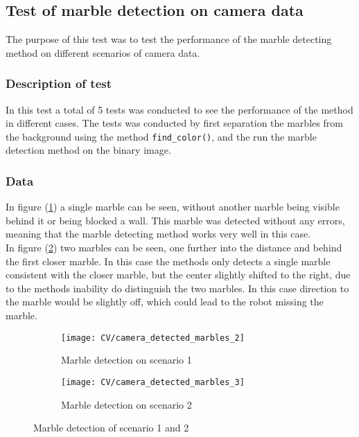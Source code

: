\documentclass[../Head/Main.tex]{subfiles}
\begin{document}
\subsection{Test of marble detection on camera data}
\label{subsec:test_cv_marble}
The purpose of this test was to test the performance of the marble detecting method on different scenarios of camera data.
\subsubsection*{Description of test}
In this test a total of 5 tests was conducted to see the performance of the method in different cases. The tests was conducted by first separation the marbles from the background using the method \texttt{find\_color()}, and the run the marble detection method on the binary image.	

\subsubsection*{Data}
In figure (\ref{fig:md_1}) a single marble can be seen, without another marble being visible behind it or being blocked a wall. This marble was detected without any errors, meaning that the marble detecting method works very well in this case.\\
In figure (\ref{fig:md_2}) two marbles can be seen, one further into the distance and behind the first closer marble. In this case the methods only detects a single marble consistent with the closer marble, but the center slightly shifted to the right, due to the methods inability do distinguish the two marbles. In this case direction to the marble would be slightly off, which could lead to the robot missing the marble.\\   
\begin{figure}[H]
	\centering
	\begin{subfigure}[b]{0.45\textwidth}
		\centering
		\texttt{[image: CV/camera\_detected\_marbles\_2]}
		\caption{Marble detection on scenario 1}
		\label{fig:md_1}
	\end{subfigure}
	\hfill
	\begin{subfigure}[b]{0.45\textwidth}
		\centering
		\texttt{[image: CV/camera\_detected\_marbles\_3]}
		\caption{Marble detection on scenario 2}
	\end{subfigure}
	\caption{Marble detection of scenario 1 and 2}
	\label{fig:md_2}
\end{figure}
\end{document}
